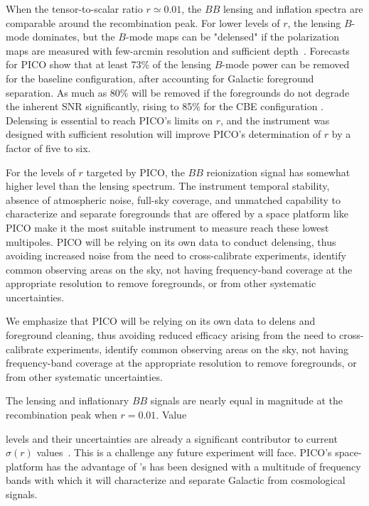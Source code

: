 \documentclass[PICOReport.tex]{subfiles}
\begin{document}
When the tensor-to-scalar ratio $r \simeq 0.01$, the $BB$ lensing and inflation spectra are comparable around the recombination peak. For lower levels of $r$, the lensing $B$-mode dominates, but the $B$-mode maps can be "delensed" if the polarization maps are measured with few-arcmin resolution and sufficient depth~\citep{2004PhRvD..69d3005S,2012JCAP...06..014S}. Forecasts for PICO show that at least 73\% of the lensing $B$-mode power can be removed for the baseline configuration, after accounting for Galactic foreground separation. As much as 80\% will be removed if the foregrounds do not degrade the inherent \ac{SNR} significantly, rising to 85\% for the CBE configuration . Delensing is essential to reach PICO's limits on $r$, and the instrument was designed with sufficient resolution will improve PICO's determination of $r$ by a factor of five to six. 

For the levels of $r$ targeted by PICO, the $BB$ reionization signal has somewhat higher level than the lensing spectrum.  The instrument temporal stability, absence of atmospheric noise, full-sky coverage, and unmatched capability to characterize and separate foregrounds that are offered by a space platform like PICO make it the most suitable instrument to measure reach these lowest multipoles. PICO will be relying on its own data to conduct delensing, thus avoiding increased noise from the need to cross-calibrate experiments, identify common observing areas on the sky, not having frequency-band coverage at the appropriate resolution to remove foregrounds, or from other systematic uncertainties.

We emphasize that PICO will be relying on its own data to delens and foreground cleaning, thus avoiding reduced efficacy arising from the need to cross-calibrate experiments, identify common observing areas on the sky, not having frequency-band coverage at the appropriate resolution to remove foregrounds, or from other systematic uncertainties.

The lensing and inflationary $BB$ signals are nearly equal in magnitude at the recombination peak when $r=0.01$. Value


levels and their uncertainties are already a significant contributor to current $\sigma(r)$ values~\cite{??}. This is a challenge any future experiment will face. PICO's space-platform has the advantage of 's has been designed with a multitude of frequency bands with which it will characterize and separate Galactic from cosmological signals. 
\end{document}
